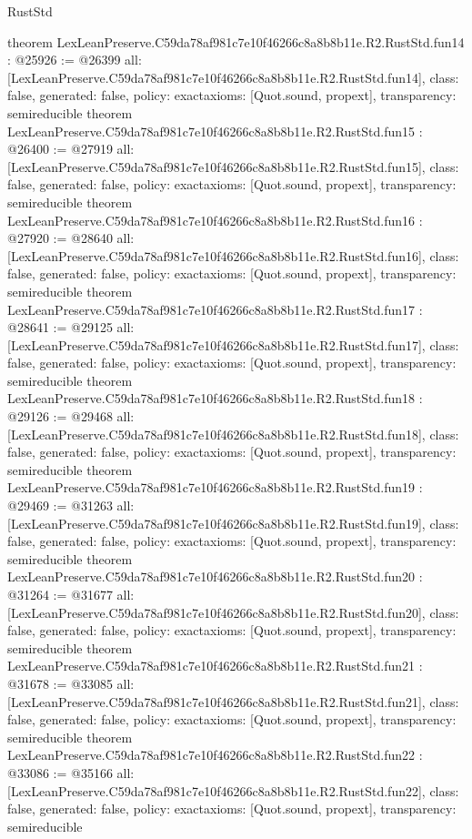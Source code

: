 \begin{lexlean}{RustStd}
\begin{coremodule}
{}
theorem LexLeanPreserve.C59da78af981c7e10f46266c8a8b8b11e.R2.RustStd.fun14 : @25926 := @26399 {
  all: [LexLeanPreserve.C59da78af981c7e10f46266c8a8b8b11e.R2.RustStd.fun14],
  class: false,
  generated: false,
  policy: exact{axioms: [Quot.sound, propext]},
  transparency: semireducible
}
theorem LexLeanPreserve.C59da78af981c7e10f46266c8a8b8b11e.R2.RustStd.fun15 : @26400 := @27919 {
  all: [LexLeanPreserve.C59da78af981c7e10f46266c8a8b8b11e.R2.RustStd.fun15],
  class: false,
  generated: false,
  policy: exact{axioms: [Quot.sound, propext]},
  transparency: semireducible
}
theorem LexLeanPreserve.C59da78af981c7e10f46266c8a8b8b11e.R2.RustStd.fun16 : @27920 := @28640 {
  all: [LexLeanPreserve.C59da78af981c7e10f46266c8a8b8b11e.R2.RustStd.fun16],
  class: false,
  generated: false,
  policy: exact{axioms: [Quot.sound, propext]},
  transparency: semireducible
}
theorem LexLeanPreserve.C59da78af981c7e10f46266c8a8b8b11e.R2.RustStd.fun17 : @28641 := @29125 {
  all: [LexLeanPreserve.C59da78af981c7e10f46266c8a8b8b11e.R2.RustStd.fun17],
  class: false,
  generated: false,
  policy: exact{axioms: [Quot.sound, propext]},
  transparency: semireducible
}
theorem LexLeanPreserve.C59da78af981c7e10f46266c8a8b8b11e.R2.RustStd.fun18 : @29126 := @29468 {
  all: [LexLeanPreserve.C59da78af981c7e10f46266c8a8b8b11e.R2.RustStd.fun18],
  class: false,
  generated: false,
  policy: exact{axioms: [Quot.sound, propext]},
  transparency: semireducible
}
theorem LexLeanPreserve.C59da78af981c7e10f46266c8a8b8b11e.R2.RustStd.fun19 : @29469 := @31263 {
  all: [LexLeanPreserve.C59da78af981c7e10f46266c8a8b8b11e.R2.RustStd.fun19],
  class: false,
  generated: false,
  policy: exact{axioms: [Quot.sound, propext]},
  transparency: semireducible
}
theorem LexLeanPreserve.C59da78af981c7e10f46266c8a8b8b11e.R2.RustStd.fun20 : @31264 := @31677 {
  all: [LexLeanPreserve.C59da78af981c7e10f46266c8a8b8b11e.R2.RustStd.fun20],
  class: false,
  generated: false,
  policy: exact{axioms: [Quot.sound, propext]},
  transparency: semireducible
}
theorem LexLeanPreserve.C59da78af981c7e10f46266c8a8b8b11e.R2.RustStd.fun21 : @31678 := @33085 {
  all: [LexLeanPreserve.C59da78af981c7e10f46266c8a8b8b11e.R2.RustStd.fun21],
  class: false,
  generated: false,
  policy: exact{axioms: [Quot.sound, propext]},
  transparency: semireducible
}
theorem LexLeanPreserve.C59da78af981c7e10f46266c8a8b8b11e.R2.RustStd.fun22 : @33086 := @35166 {
  all: [LexLeanPreserve.C59da78af981c7e10f46266c8a8b8b11e.R2.RustStd.fun22],
  class: false,
  generated: false,
  policy: exact{axioms: [Quot.sound, propext]},
  transparency: semireducible
}
\end{coremodule}
\end{lexlean}
